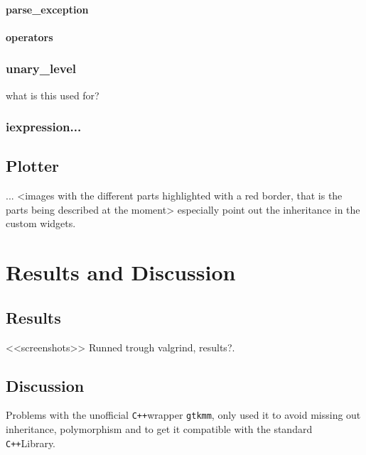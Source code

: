 \documentclass[a4paper,11pt]{kth-mag}
\newcommand{\Cpp}{\texttt{C++}}
\newcommand{\Gtkmm}{\texttt{gtkmm}}
\begin{document}
\subsubsection{parse\_exception}
\subsubsection{operators}

\subsection{unary\_level}
what is this used for?
\subsection{iexpression...}

\section{Plotter}
...
<images with the different parts highlighted with a red border, that is the parts being described at the moment>
especially point out the inheritance in the custom widgets.

\chapter{Results and Discussion}

\section{Results}
<<screenshots>>
Runned trough valgrind, results?.

\section{Discussion}
Problems with the unofficial \Cpp wrapper \Gtkmm, only used it to avoid missing out inheritance, polymorphism and to get it compatible with the standard \Cpp Library. 
 
\end{document}
